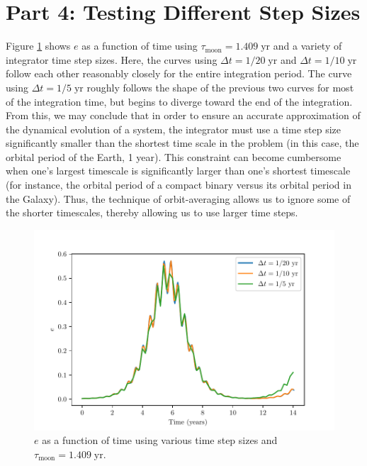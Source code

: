 \documentclass[11pt]{article}
\begin{document}
\section*{Part 4: Testing Different Step Sizes}
Figure \ref{fig:steps} shows $e$ as a function of time using $\tau_{\mathrm{moon}} = 1.409 \; \mathrm{yr}$ and a variety of integrator time step sizes. Here, the curves using $\Delta t = 1/20 \; \mathrm{yr}$ and $\Delta t = 1/10 \; \mathrm{yr}$ follow each other reasonably closely for the entire integration period. The curve using  $\Delta t = 1/5 \; \mathrm{yr}$ roughly follows the shape of the previous two curves for most of the integration time, but begins to diverge toward the end of the integration. From this, we may conclude that in order to ensure an accurate approximation of the dynamical evolution of a system, the integrator must use a time step size significantly smaller than the shortest time scale in the problem (in this case, the orbital period of the Earth, 1 year). This constraint can become cumbersome when one's largest timescale is significantly larger than one's shortest timescale (for instance, the orbital period of a compact binary versus its orbital period in the Galaxy). Thus, the technique of orbit-averaging allows us to ignore some of the shorter timescales, thereby allowing us to use larger time steps.

\begin{figure}[h!]
    \centering
    \includegraphics[width=\textwidth]{plots/figure4.pdf}
    \caption{$e$ as a function of time using various time step sizes and $\tau_{\mathrm{moon}} = 1.409 \; \mathrm{yr}$.}
    \label{fig:steps}
\end{figure}
\end{document}
